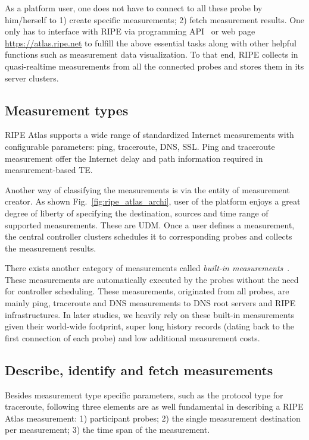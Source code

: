 As a platform user, one does not have to connect to all these probe by him/herself to 1) create specific measurements; 2) fetch measurement results. 
One only has to interface with RIPE via programming API~\cite{atlasapi} or web page \url{https://atlas.ripe.net} to fulfill the above essential tasks along with other helpful functions such as measurement data visualization.
To that end, RIPE collects in quasi-realtime measurements from all the connected probes and stores them in its server clusters.

\subsection{Measurement types}
RIPE Atlas supports a wide range of standardized Internet measurements with configurable parameters: ping, traceroute, DNS, SSL.
Ping and traceroute measurement offer the Internet delay and path information required in measurement-based TE.

Another way of classifying the measurements is via the entity of measurement creator. As shown Fig.~\ref{fig:ripe_atlas_archi}, user of the platform enjoys a great degree of 
liberty of specifying the destination, sources and time range of supported measurements. These are \acf{UDM}. Once a user defines a measurement, the central controller clusters schedules it to corresponding probes and collects the measurement results.

There exists another category of measurements called \textit{built-in measurements}~\cite{atlas}. These measurements are automatically executed by the probes without the need for controller scheduling. These measurements, originated from all probes, are mainly ping, traceroute and DNS measurements to DNS root servers and RIPE infrastructures.
In later studies, we heavily rely on these built-in measurements given their world-wide footprint, super long history records (dating back to the first connection of each probe) and low additional measurement costs.

\subsection{Describe, identify and fetch measurements}
Besides measurement type specific parameters, such as the protocol type for traceroute, following three elements are as well fundamental in describing a RIPE Atlas measurement: 1) participant probes; 2) the single measurement destination per measurement; 3) the time span of the measurement. 

